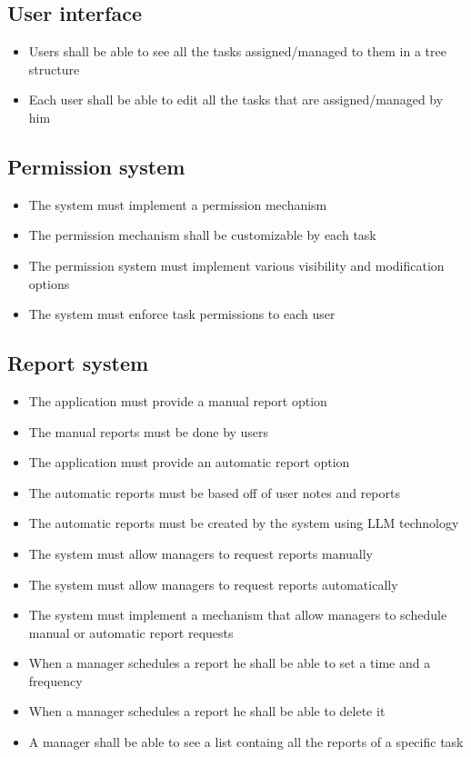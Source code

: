\documentclass{article}
\begin{document}
\subsection{User interface}
\begin{itemize}
    \item Users shall be able to see all the tasks assigned/managed to them in a tree structure
    \item Each user shall be able to edit all the tasks that are assigned/managed by him
\end{itemize}
\subsection{Permission system}
\begin{itemize}
    \item The system must implement a permission mechanism
    \item The permission mechanism shall be customizable by each task
    \item The permission system must implement various visibility and modification options
    \item The system must enforce task permissions to each user
\end{itemize}
\subsection{Report system}
\begin{itemize}
    \item The application must provide a manual report option
    \item The manual reports must be done by users
    \item The application must provide an automatic report option
    \item The automatic reports must be based off of user notes and reports
    \item The automatic reports must be created by the system using LLM technology
    \item The system must allow managers to request reports manually
    \item The system must allow managers to request reports automatically
    \item The system must implement a mechanism that allow managers to schedule manual or automatic report requests
    \item When a manager schedules a report he shall be able to set a time and a frequency
    \item When a manager schedules a report he shall be able to delete it
    \item A manager shall be able to see a list containg all the reports of a specific task
\end{itemize}
\end{document}

